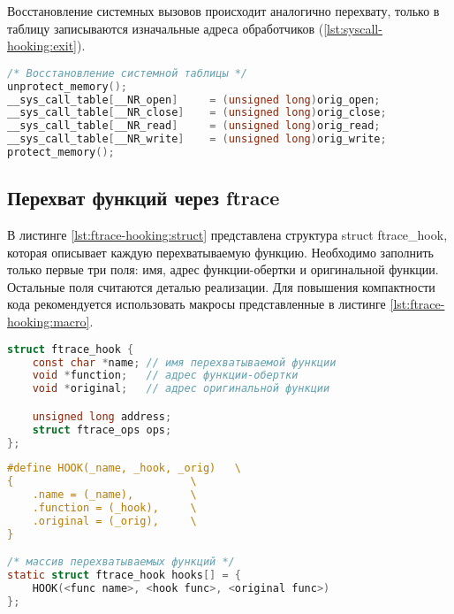     Восстановление системных вызовов происходит аналогично перехвату,
    только в таблицу записываются изначальные адреса обработчиков (\ref{lst:syscall-hooking:exit}).

    \begin{lstlisting}[language=C, label=lst:syscall-hooking:exit, caption=Восстановление таблицы системных вызовов]
/* Восстановление системной таблицы */
unprotect_memory();
__sys_call_table[__NR_open]     = (unsigned long)orig_open;
__sys_call_table[__NR_close]    = (unsigned long)orig_close;
__sys_call_table[__NR_read]     = (unsigned long)orig_read;
__sys_call_table[__NR_write]    = (unsigned long)orig_write;
protect_memory();
    \end{lstlisting}

    \subsection{Перехват функций через ftrace}
        В листинге \ref{lst:ftrace-hooking:struct} представлена структура struct ftrace\_hook,
        которая описывает каждую перехватываемую функцию. 
        Необходимо заполнить только первые три поля: 
        имя, адрес функции-обертки и оригинальной функции.
        Остальные поля считаются деталью реализации. 
        Для повышения компактности кода рекомендуется использовать
        макросы представленные в листинге \ref{lst:ftrace-hooking:macro}.
    
        \begin{lstlisting}[language=C, label=lst:ftrace-hooking:struct, caption=Структура перехватываемой функции]
struct ftrace_hook {
    const char *name; // имя перехватываемой функции
    void *function;   // адрес функции-обертки
    void *original;   // адрес оригинальной функции

    unsigned long address;
    struct ftrace_ops ops;
};
        \end{lstlisting}

        \begin{lstlisting}[language=C, label=lst:ftrace-hooking:macro, caption=Макрос для заполнения структуры перехватываемой функции]
#define HOOK(_name, _hook, _orig)   \
{                            \
    .name = (_name),         \
    .function = (_hook),     \
    .original = (_orig),     \
}

/* массив перехватываемых функций */
static struct ftrace_hook hooks[] = {
    HOOK(<func name>, <hook func>, <original func>)
};
        \end{lstlisting}

